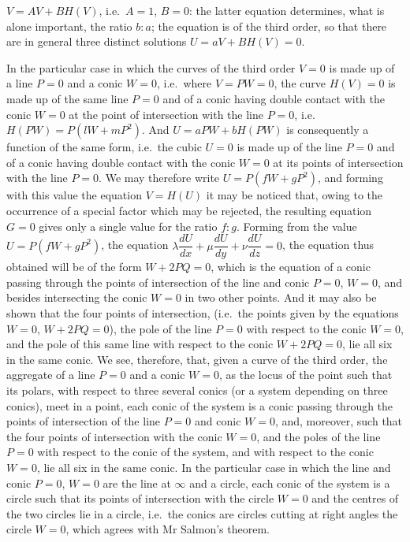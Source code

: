 \documentclass[11pt]{article}
\begin{document}
\medskip

\noindent $V = A V + B H(V)$, i.e.\ $A = 1$, $B = 0$: the latter equation determines, what is alone
important, the ratio $b : a$; the equation is of the third order, so that there are in
general three distinct solutions $U = aV + B H(V) = 0$.

In the particular case in which the curves of the third order $V = 0$ is made up
of a line $P = 0$ and a conic $W = 0$, i.e.\ where $V = P W = 0$, the curve $H(V) = 0$ is
made up of the same line $P = 0$ and of a conic having double contact with the conic
$W = 0$ at the point of intersection with the line $P = 0$, i.e.\ $H(PW) = P(lW + mP^{2})$.
And $U = aPW + bH(PW)$ is consequently a function of the same form, i.e.\ the cubic
$U = 0$ is made up of the line $P = 0$ and of a conic having double contact with the
conic $W = 0$ at its points of intersection with the line $P = 0$. We may therefore write
$U = P(fW + gP^{2})$, and forming with this value the equation $V = H(U)$ it
may be noticed that, owing to the occurrence of a special factor which may be rejected,
the resulting equation $G = 0$ gives only a single value for the ratio $f : g$. Forming
from the value $U = P(fW + gP^{2})$, the equation $\lambda \dfrac{dU}{dx} + \mu \dfrac{dU}{dy} + \nu \dfrac{dU}{dz} = 0$, the equation
thus obtained will be of the form $W + 2PQ = 0$, which is the equation of a conic
passing through the points of intersection of the line and conic $P = 0$, $W = 0$, and
besides intersecting the conic $W = 0$ in two other points. And it may also be shown
that the four points of intersection, (i.e.\ the points given by the equations $W = 0$,
$W + 2PQ = 0$), the pole of the line $P = 0$ with respect to the conic $W = 0$, and the pole
of this same line with respect to the conic $W + 2PQ = 0$, lie all six in the same conic.
We see, therefore, that, given a curve of the third order, the aggregate of a line
$P = 0$ and a conic $W = 0$, as the locus of the point such that its polars, with respect
to three several conics (or a system depending on three conics), meet in a point, each
conic of the system is a conic passing through the points of intersection of the line
$P = 0$ and conic $W = 0$, and, moreover, such that the four points of intersection with
the conic $W = 0$, and the poles of the line $P = 0$ with respect to the conic of the
system, and with respect to the conic $W = 0$, lie all six in the same conic. In the
particular case in which the line and conic $P = 0$, $W = 0$ are the line at $\infty$ and a
circle, each conic of the system is a circle such that its points of intersection with
the circle $W = 0$ and the centres of the two circles lie in a circle, i.e.\ the conics are
circles cutting at right angles the circle $W = 0$, which agrees with Mr Salmon's theorem.
\end{document}
